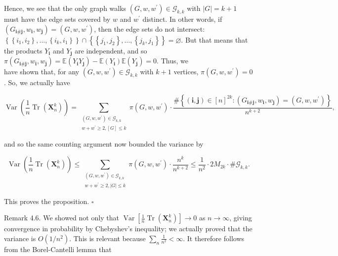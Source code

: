 \documentclass[10pt]{article}
\begin{document}
Hence, we see that the only graph walks $\left(G, w, w^{\prime}\right) \in \mathcal{G}_{k, k}$ with $|G|=k+1$ must have the edge sets covered by $w$ and $w^{\prime}$ distinct. In other words, if $\left(G_{\mathbf{i} \# \mathbf{j}}, w_{\mathbf{i}}, w_{\mathbf{j}}\right)=\left(G, w, w^{\prime}\right)$, then the edge sets do not intersect: $\left\{\left\{i_{1}, i_{2}\right\}, \ldots,\left\{i_{k}, i_{1}\right\}\right\} \cap\left\{\left\{j_{1}, j_{2}\right\}, \ldots,\left\{j_{k}, j_{1}\right\}\right\}=\varnothing$. But that means that the products $Y_{\mathbf{i}}$ and $Y_{\mathbf{j}}$ are independent, and so $\pi\left(G_{\mathbf{i} \# \mathbf{j}}, w_{\mathbf{i}}, w_{\mathbf{j}}\right)=\mathbb{E}\left(Y_{\mathbf{i}} Y_{\mathbf{j}}\right)-\mathbb{E}\left(Y_{\mathbf{i}}\right) \mathbb{E}\left(Y_{\mathbf{j}}\right)=0$. Thus, we\\
have shown that, for any $\left(G, w, w^{\prime}\right) \in \mathcal{G}_{k, k}$ with $k+1$ vertices, $\pi\left(G, w, w^{\prime}\right)=0$. So, we actually have

$$
\operatorname{Var}\left(\frac{1}{n} \operatorname{Tr}\left(\mathbf{X}_{n}^{k}\right)\right)=\sum_{\substack{\left(G, w, w^{\prime}\right) \in \mathcal{G}_{k, k} \\ w+w^{\prime} \geq 2,[G] \leq k}} \pi\left(G, w, w^{\prime}\right) \cdot \frac{\#\left\{(\mathbf{i}, \mathbf{j}) \in[n]^{2 k}:\left(G_{\mathbf{i} \# \mathbf{j}}, w_{\mathbf{i}}, w_{\mathbf{j}}\right)=\left(G, w, w^{\prime}\right)\right\}}{n^{k+2}},
$$

and so the same counting argument now bounded the variance by

$$
\operatorname{Var}\left(\frac{1}{n} \operatorname{Tr}\left(\mathbf{X}_{n}^{k}\right)\right) \leq \sum_{\substack{\left(G, w, w^{\prime}\right) \in \mathcal{G}_{k, k} \\ w+w^{\prime} \geq 2,|G| \leq k}} \pi\left(G, w, w^{\prime}\right) \cdot \frac{n^{k}}{n^{k+2}} \leq \frac{1}{n^{2}} \cdot 2 M_{2 k} \cdot \# \mathcal{G}_{k, k} .
$$

This proves the proposition. \(\square\)

Remark 4.6. We showed not only that $\operatorname{Var}\left[\frac{1}{n} \operatorname{Tr}\left(\mathbf{X}_{n}^{k}\right)\right] \rightarrow 0$ as $n \rightarrow \infty$, giving convergence in probability by Chebyshev's inequality; we actually proved that the variance is $O\left(1 / n^{2}\right)$. This is relevant because $\sum_{n} \frac{1}{n^{2}}<\infty$. It therefore follows from the Borel-Cantelli lemma that
\end{document}

